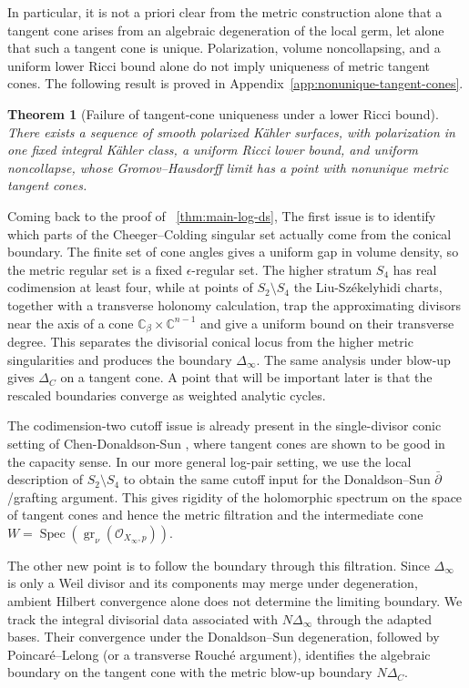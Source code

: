 \documentclass[11pt]{amsart}
\newtheorem{theorem}{Theorem}[section]
\theoremstyle{definition}
\theoremstyle{remark}
\begin{document}
In particular, it is not a priori clear from the metric construction alone that a
tangent cone arises from an algebraic degeneration of the local germ, let alone
that such a tangent cone is unique. Polarization, volume noncollapsing, and a uniform lower
Ricci bound alone do not imply uniqueness of metric tangent cones.  The
following result is proved in Appendix~\ref{app:nonunique-tangent-cones}.

\begin{theorem}[Failure of tangent-cone uniqueness under a lower Ricci bound]
There exists a sequence of smooth polarized K\"ahler surfaces, with
polarization in one fixed integral K\"ahler class, a uniform Ricci lower
bound, and uniform noncollapse, whose Gromov--Hausdorff limit has a point
with nonunique metric tangent cones.
\end{theorem}

Coming back to the proof of ~\ref{thm:main-log-ds}, The first issue is to identify which parts of the Cheeger--Colding singular set
actually come from the conical boundary. The finite set of cone angles gives a
uniform gap in volume density, so the metric regular set is a fixed
$\epsilon$-regular set. The higher stratum $S_4$ has real codimension at least
four, while at points of $S_2\setminus S_4$ the Liu-Székelyhidi charts,
together with a transverse holonomy calculation, trap the approximating
divisors near the axis of a cone
$\mathbb C_\beta\times\mathbb C^{n-1}$ and give a uniform bound on their
transverse degree. This separates the divisorial conical locus from the higher
metric singularities and produces the boundary $\Delta_\infty$. The same
analysis under blow-up gives $\Delta_C$ on a tangent cone. A point that will be
important later is that the rescaled boundaries converge as weighted analytic
cycles.

The codimension-two cutoff issue is already present in the single-divisor conic
setting of Chen-Donaldson-Sun \cite[Sections~2.1--2.3]{CDSII}, where tangent
cones are shown to be good in the capacity sense. In our more general log-pair
setting, we use the local description of $S_2\setminus S_4$ to obtain the same
cutoff input for the Donaldson--Sun $\bar\partial$/grafting argument.
This gives rigidity of the holomorphic spectrum on the
space of tangent cones and hence the metric filtration and the intermediate
cone $W=\operatorname{Spec}(\operatorname{gr}_\nu(
\mathcal O_{X_\infty,p}))$.

The other new point is to follow the boundary through this filtration. Since
$\Delta_\infty$ is only a Weil divisor and its components may merge under
degeneration, ambient Hilbert convergence alone does not determine the limiting
boundary. We track the integral divisorial data associated with
$N\Delta_\infty$ through the adapted bases. Their convergence under the Donaldson--Sun degeneration, followed by Poincar\'e--Lelong (or a transverse Rouch\'e argument), identifies the algebraic boundary on the tangent cone with the metric blow-up boundary
$N\Delta_C$.
\end{document}
